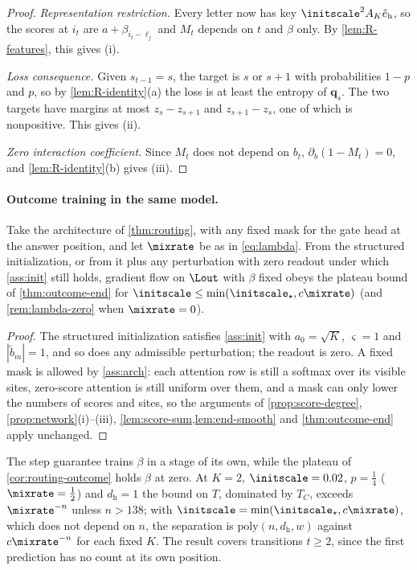 \begin{proof}
\emph{Representation restriction.} Every letter now has key $\initscale^2A_K\hat e_{\mathrm h}$, so the scores at $i_t$ are
$a+\beta_{i_t-\ell_j}$ and $M_t$ depends on $t$ and $\beta$ only. By \cref{lem:R-features}, this gives (i).

\emph{Loss consequence.} Given $s_{t-1}=s$, the target is $s$ or $s+1$ with probabilities $1-p$ and $p$, so by \cref{lem:R-identity}(a)
the loss is at least the entropy of $\bm q_s$. The two targets have margins at most $z_s-z_{s+1}$ and $z_{s+1}-z_s$, one of which is
nonpositive. This gives (ii).

\emph{Zero interaction coefficient.} Since $M_t$ does not depend on $b_t$, $\partial_b(1-M_t)=0$, and \cref{lem:R-identity}(b) gives (iii).
\end{proof}

\paragraph{Outcome training in the same model.}

\begin{corollary}
\label{cor:routing-outcome}
Take the architecture of \cref{thm:routing}, with any fixed mask for the gate head at the answer position, and let
$\mixrate$ be as in \cref{eq:lambda}. From the structured initialization, or from it plus any perturbation with zero readout under which
\cref{ass:init} still holds, gradient flow on $\Lout$ with $\beta$ fixed obeys the plateau bound of \cref{thm:outcome-end}
for $\initscale\le\min(\initscale_\star,c\mixrate)$ (and \cref{rem:lambda-zero} when $\mixrate=0$).
\end{corollary}

\begin{proof}
The structured initialization satisfies \cref{ass:init} with $a_0=\sqrt K$, $\varsigma=1$ and $|\tilde b_m|=1$, and so does any
admissible perturbation; the readout is zero. A fixed mask is allowed by \cref{ass:arch}: each attention row is still a
softmax over its visible sites, zero-score attention is still uniform over them, and a mask can only lower the numbers of
scores and sites, so the arguments of \cref{prop:score-degree}, \cref{prop:network}(i)--(iii), \cref{lem:score-sum,lem:end-smooth}
and \cref{thm:outcome-end} apply unchanged.
\end{proof}

\begin{remark}[Scope]
\label{rem:routing-scope}
The step guarantee trains $\beta$ in a stage of its own, while the plateau of \cref{cor:routing-outcome} holds $\beta$ at zero.
At $K=2$, $\initscale=0.02$, $p=\tfrac14$ ($\mixrate=\tfrac12$) and $d_{\mathrm h}=1$ the bound on $T$, dominated by $T_C$, exceeds
$\mixrate^{-n}$ unless $n>138$; with $\initscale=\min(\initscale_\star,c\mixrate)$, which does not depend on $n$, the separation is
$\mathrm{poly}(n,d_{\mathrm h},w)$ against $c\mixrate^{-n}$ for each fixed $K$. The result covers transitions $t\ge2$, since the first
prediction has no count at its own position.
\end{remark}
